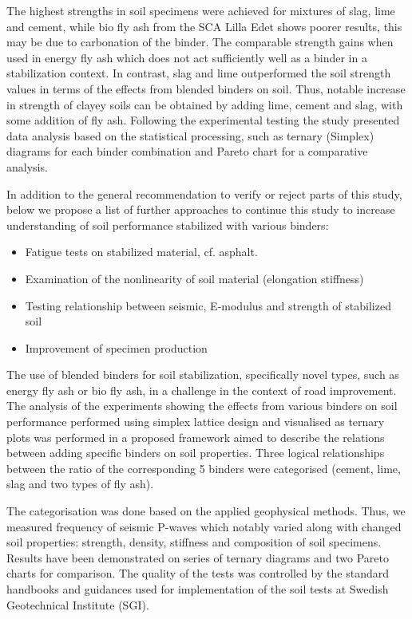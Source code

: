 \documentclass[constrmater,article,submit,pdftex,moreauthors]{Definitions/mdpi}
\begin{document}
The highest strengths in soil specimens were achieved for mixtures of slag, lime and cement, while bio fly ash from the SCA Lilla Edet shows poorer results, this may be due to carbonation of the binder. The comparable strength gains when used in energy fly ash which does not act sufficiently well as a binder in a stabilization context. In contrast, slag and lime outperformed the soil strength values in terms of the effects from blended binders on soil. Thus, notable increase in strength of clayey soils can be obtained by adding lime, cement and slag, with some addition of fly ash. Following the experimental testing the study presented data analysis based on the statistical processing, such as ternary (Simplex) diagrams for each binder combination and Pareto chart for a comparative analysis. 

In addition to the general recommendation to verify or reject parts of this study, below we propose a list of further approaches to continue this study to increase understanding of soil performance stabilized with various binders:
\begin{itemize}
	\item	Fatigue tests on stabilized material, cf. asphalt. 
	\item Examination of the nonlinearity of soil material (elongation stiffness)
	\item Testing relationship between seismic, E-modulus and strength of stabilized soil
	\item Improvement of specimen production
\end{itemize}

The use of blended binders for soil stabilization, specifically novel types, such as energy fly ash or bio fly ash, in a challenge in the context of road improvement. The analysis of the experiments showing the effects from various binders on soil performance performed using simplex lattice design and visualised as ternary plots was performed in a proposed framework aimed to describe the relations between adding specific binders on soil properties. Three logical relationships between the ratio of the corresponding 5 binders were categorised (cement, lime, slag and two types of fly ash). 

The categorisation was done based on the applied geophysical methods. Thus, we measured frequency of seismic P-waves which notably varied along with changed soil properties: strength, density, stiffness and composition of soil specimens. Results have been demonstrated on series of ternary diagrams and two Pareto charts for comparison. The quality of the tests was controlled by the standard handbooks and guidances used for implementation of the soil tests at Swedish Geotechnical Institute (SGI).
\end{document}
